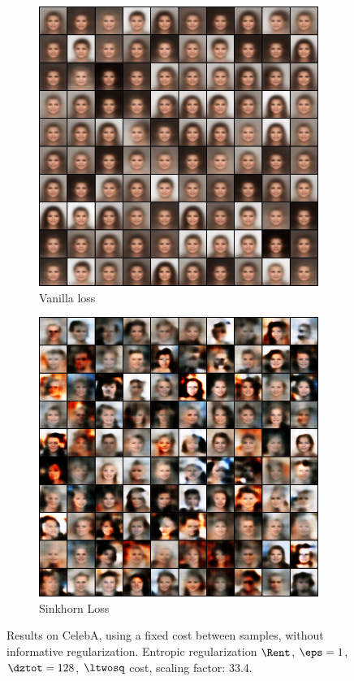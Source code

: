 \begin{figure}[!htbp]
   \centering
\begin{subfigure}[t]{0.48\textwidth}
   \includegraphics[width=\textwidth,center]{2019-04-30/celeba/fixed-cost/a_vanilla.png}
   \caption{Vanilla loss}
   \label{fig:2019-04-30_celeba_fixed-cost-a}
\end{subfigure}
\begin{subfigure}[t]{0.48\textwidth}
   \includegraphics[width=\textwidth,center]{2019-04-30/celeba/fixed-cost/b_sinkhorn.png}
   \caption{Sinkhorn Loss}
   \label{fig:2019-04-30_celeba_fixed-cost-b}
\end{subfigure}
   \caption{Results on CelebA, using a fixed cost between samples, without informative regularization. Entropic regularization $\Rent$, $\eps = 1$, $\dztot = 128$, $\ltwosq$ cost, scaling factor: 33.4.}
   \label{fig:2019-04-30_celeba_fixed-cost}
\end{figure}